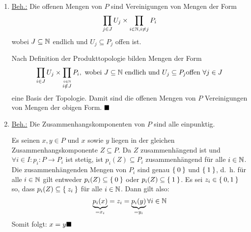 \begin{solution}[\ref{ub2:aufg4}]
    \begin{enumerate}[label=(\alph*)]
        \item \underline{Beh.:} Die offenen Mengen von $P$ sind
              Vereinigungen von Mengen der Form 
              \[\prod_{j \in J} U_j \times \prod_{i \in \mathbb{N}, i \neq j} P_i\]
              wobei $J \subseteq \mathbb{N}$ endlich und $U_j \subseteq P_j$
              offen ist.
              \begin{beweis}
                Nach Definition der Produkttopologie bilden Mengen
                der Form
                \[\prod_{i \in J} U_j \times \prod_{\stackrel{i \in \mathbb{N}}{i \notin J}} P_i, \text{ wobei } J \subseteq \mathbb{N} \text{ endlich und } U_j \subseteq P_j \text{offen } \forall{j \in J}\]
                eine Basis der Topologie. Damit sind die offenen 
                Mengen von $P$ Vereinigungen von Mengen der obigen
                Form. $\qed$
              \end{beweis}
        \item \underline{Beh.:} Die Zusammenhangskomponenten von $P$
              sind alle einpunktig.
              \begin{beweis}
                Es seinen $x,y \in P$ und $x$ sowie $y$ liegen in der
                gleichen Zusammenhangskomponente $Z \subseteq P$.
                Da $Z$ zusammenhängend ist und $\forall{i \in I}: p_i : P \rightarrow P_i$
                ist stetig, ist $p_i(Z) \subseteq P_i$ zusammenhängend
                für alle $i \in \mathbb{N}$. Die zusammenhängenden Mengen
                von $P_i$ sind genau $\Set{0}$ und $\Set{1}$, d.~h.
                für alle $i \in \mathbb{N}$ gilt entweder $p_i(Z) \subseteq \Set{0}$
                oder $p_i(Z) \subseteq \Set{1}$. Es sei $z_i \in \Set{0,1}$
                so, dass $p_i(Z) \subseteq \Set{z_i}$ für alle $i \in \mathbb{N}$.
                Dann gilt also: 
                \[\underbrace{p_i(x)}_{= x_i} = z_i = \underbrace{p_i(y)}_{= y_i} \forall i \in \mathbb{N}\]
                Somit folgt: $x = y \qed$
                
              \end{beweis}
    \end{enumerate}
\end{solution}
